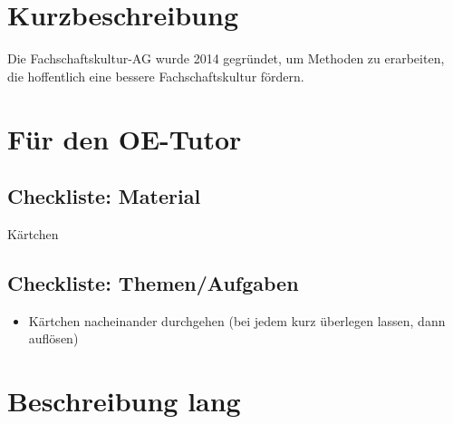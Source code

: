 \documentclass[a4paper,11pt]{scrartcl} %
\newenvironment{myitemize}{\begin{itemize}\itemsep -2pt}{\end{itemize}} %
\begin{document}
\thispagestyle{firststyle}

\begin{wrapfigure}{r}{130pt}
\vspace{-78pt}
  \fbox{
  \begin{minipage}{140pt}
   \tableofcontents
  \end{minipage}
  }
\end{wrapfigure}

\section{Kurzbeschreibung} %
    Die Fachschaftskultur-AG wurde 2014 gegründet, um Methoden zu erarbeiten, die hoffentlich eine bessere Fachschaftskultur fördern.
    
\section{Für den OE-Tutor}
  \subsection{Checkliste: Material} %
    \begin{multicols}{2}[]
      \begin{myitemize}
      \begin{raggedright}
	\item[\Square] Kärtchen
      \end{raggedright}
      \end{myitemize}
    \end{multicols}
  \subsection{Checkliste: Themen/Aufgaben} %
      \begin{myitemize}
	\item[\Square] Kärtchen nacheinander durchgehen (bei jedem kurz überlegen lassen, dann auflösen)
      \end{myitemize}

 
\section{Beschreibung lang} 
\end{document}

